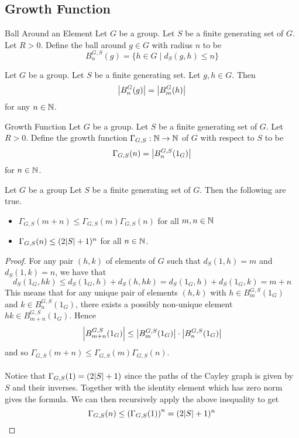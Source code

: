 \documentclass[a4paper]{article}
\begin{document}
\subsection{Growth Function}
\begin{defn}{Ball Around an Element}{} Let $G$ be a group. Let $S$ be a finite generating set of $G$. Let $R>0$. Define the ball around $g\in G$ with radius $n$ to be $$B_n^{G,S}(g)=\{h\in G\;|\;d_S(g,h)\leq n\}$$
\end{defn}

\begin{prp}{}{} Let $G$ be a group. Let $S$ be a finite generating set. Let $g,h\in G$. Then $$\abs{B_n^G(g)}=\abs{B_m^G(h)}$$ for any $n\in\mathbb{N}$. 
\end{prp}

\begin{defn}{Growth Function}{} Let $G$ be a group. Let $S$ be a finite generating set of $G$. Let $R>0$. Define the growth function $\Gamma_{G,S}:\mathbb{N}\to\mathbb{N}$ of $G$ with respect to $S$ to be $$\Gamma_{G,S}(n)=\abs{B_n^{G,S}(1_G)}$$ for $n\in\mathbb{N}$. 
\end{defn}

\begin{prp}{}{} Let $G$ be a group Let $S$ be a finite generating set of $G$. Then the following are true. 
\begin{itemize}
\item $\Gamma_{G,S}(m+n)\leq\Gamma_{G,S}(m)\Gamma_{G,S}(n)$ for all $m,n\in\mathbb{N}$
\item $\Gamma_{G,S}(n)\leq(2\abs{S}+1)^n$ for all $n\in\mathbb{N}$. 
\end{itemize} \tcbline
\begin{proof}
For any pair $(h,k)$ of elements of $G$ such that $d_S(1,h)=m$ and $d_S(1,k)=n$, we have that $$d_S(1_G,hk)\leq d_S(1_G,h)+d_S(h,hk)=d_S(1_G,h)+d_S(1_G,k)=m+n$$ This means that for any unique pair of elements $(h,k)$ with $h\in B_m^{G,S}(1_G)$ and $k\in B_n^{G,S}(1_G)$, there exists a possibly non-unique element $hk\in B_{m+n}^{G,S}(1_G)$. Hence $$\abs{B_{m+n}^{G,S}(1_G)}\leq\abs{B_m^{G,S}(1_G)}\cdot\abs{B_n^{G,S}(1_G)}$$ and so $\Gamma_{G,S}(m+n)\leq\Gamma_{G,S}(m)\Gamma_{G,S}(n)$. \\~\\

Notice that $\Gamma_{G,S}(1)=(2\abs{S}+1)$ since the paths of the Cayley graph is given by $S$ and their inverses. Together with the identity element which has zero norm gives the formula. We can then recursively apply the above inequality to get $$\Gamma_{G,S}(n)\leq\left(\Gamma_{G,S}(1)\right)^n=(2\abs{S}+1)^n$$
\end{proof}
\end{prp}
\end{document}
